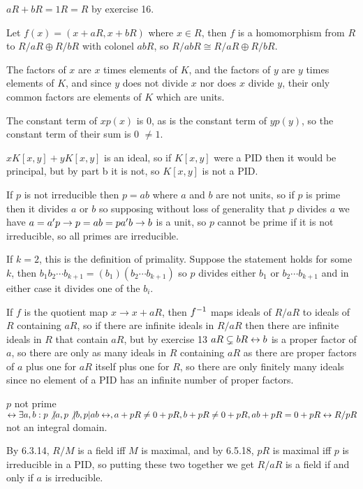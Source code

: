 \documentclass[11pt, oneside]{article}   	%
\begin{document}
$aR + bR = 1R = R$ by exercise 16.

Let $f(x) = (x + aR, x+bR)$ where $x \in R$, then $f$ is a homomorphism from $R$ to $R/aR \oplus R/bR$ with colonel $abR$, so $R/abR \cong R/aR \oplus R/bR$. 
\item \be
\item The factors of $x$ are $x$ times elements of $K$, and the factors of $y$ are $y$ times elements of $K$, and since $y$ does not divide $x$ nor does $x$ divide $y$, their only common factors are elements of $K$ which are units.
\item The constant term of $xp(x)$ is 0, as is the constant term of $yp(y)$, so the constant term of their sum is 0 $\not= 1$. 
\item $xK[x, y] + yK[x, y]$ is an ideal, so if $K[x, y]$ were a PID then it would be principal, but by part b it is not, so $K[x, y]$ is not a PID.
\ee
\item If $p$ is not irreducible then $p = ab$ where $a$ and $b$ are not units, so if $p$ is prime then it divides $a$ or $b$ so supposing without loss of generality that $p$ divides $a$ we have $a = a'p \rightarrow p = ab = pa'b \rightarrow b$ is a unit, so $p$ cannot be prime if it is not irreducible, so all primes are irreducible.
\item If $k=2$, this is the definition of primality. Suppose the statement holds for some $k$, then $b_1b_2\cdots b_{k+1} = (b_1)(b_2\cdots b_{k+1})$ so $p$ divides either $b_1$ or $b_2\cdots b_{k+1}$ and in either case it divides one of the $b_i$.
\item If $f$ is the quotient map $x \to x + aR$, then $f^{-1}$ maps ideals of $R/aR$ to ideals of $R$ containing $aR$, so if there are infinite ideals in $R/aR$ then there are infinite ideals in $R$ that contain $aR$, but by exercise 13 $aR \subsetneq bR \leftrightarrow b $ is a proper factor of $a$, so there are only as many ideals in $R$ containing $aR$ as there are proper factors of $a$ plus one for $aR$ itself plus one for $R$, so there are only finitely many ideals since no element of a PID has an infinite number of proper factors.
\item \be
\item $p$ not prime $\leftrightarrow \exists a, b: p \not | a, p \not | b, p | ab \leftrightarrow, a + pR \not = 0 + pR, b + pR \not = 0 + pR, ab + pR = 0 + pR \leftrightarrow R/pR$ not an integral domain.
\item By 6.3.14, $R/M$ is a field iff $M$ is maximal, and by 6.5.18, $pR$ is maximal iff $p$ is irreducible in a PID, so putting these two together we get $R/aR$ is a field if and only if $a$ is irreducible.
\end{document}

